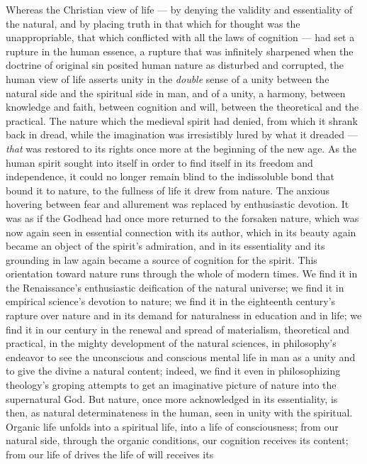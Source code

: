 \documentclass[12pt,a4paper,openany]{book}
\newcommand{\opage}[1]{\marginnote{\footnotesize\textit{[#1]}}}
\begin{document}
Whereas the Christian view of life --- by denying the validity
and essentiality of the natural, and by placing truth in that
which for thought was the unappropriable, that which conflicted
with all the laws of cognition --- had set a rupture in the human
essence, a rupture that was infinitely sharpened when the
doctrine of original sin posited human nature as disturbed and
corrupted, the human view of life asserts unity in the
\emph{double} sense of a unity between the natural side and
\opage{493}the spiritual side in man, and of a unity, a harmony, between
knowledge and faith, between cognition and will, between the
theoretical and the practical. The nature which the medieval
spirit had denied, from which it shrank back in dread, while
the imagination was irresistibly lured by what it dreaded ---
\emph{that} was restored to its rights once more at the beginning
of the new age. As the human spirit sought into itself in order
to find itself in its freedom and independence, it could no
longer remain blind to the indissoluble bond that bound it to
nature, to the fullness of life it drew from nature. The anxious
hovering between fear and allurement was replaced by enthusiastic
devotion. It was as if the Godhead had once more returned to the
forsaken nature, which was now again seen in essential connection
with its author, which in its beauty again became an object of
the spirit's admiration, and in its essentiality and its grounding
in law again became a source of cognition for the spirit. This
orientation toward nature runs through the whole of modern times.
We find it in the Renaissance's enthusiastic deification of the
natural universe; we find it in empirical science's devotion to
nature; we find it in the eighteenth century's rapture over nature
and in its demand for naturalness in education and in life; we find
it in our century in the renewal and spread of materialism,
theoretical and practical, in the mighty development of the natural
sciences, in philosophy's endeavor to see the unconscious and
conscious mental life in man as a unity and to give the divine a
natural content; indeed, we find it even in philosophizing theology's
groping attempts to get an imaginative picture of nature into the
supernatural God. But nature, once more acknowledged in its
essentiality, is then, as natural determinateness in the human,
seen in unity with the spiritual. Organic life unfolds into a
spiritual life, into a life of consciousness; from our natural
side, through the organic conditions, our cognition receives its
content; from our life of drives the life of will receives its
\end{document}

